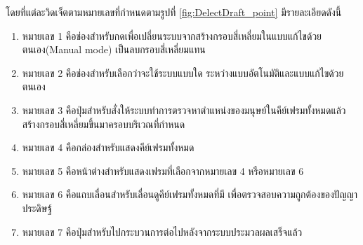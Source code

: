 โดยที่แต่ละวิดเจ็ตตามหมายเลขที่กำหนดตามรูปที่ \ref{fig:DelectDraft_point} มีรายละเอียดดังนี้
\begin{enumerate}
	\setlength\itemsep{-0.25em}
    \item หมายเลข 1 คือช่องสำหรับกดเพื่อเปลี่ยนระบบจากสร้างกรอบสี่เหลี่ยมในแบบแก้ไขด้วยตนเอง(Manual mode) เป็นลบกรอบสี่เหลี่ยมแทน
    \item หมายเลข 2 คือช่องสำหรับเลือกว่าจะใช้ระบบแบบใด ระหว่างแบบอัตโนมัติและแบบแก้ไขด้วยตนเอง
    \item หมายเลข 3 คือปุ่มสำหรับสั่งให้ระบบทำการตรวจหาตำแหน่งของมนุษย์ในคีย์เฟรมทั้งหมดแล้วสร้างกรอบสี่เหลี่ยมขึ้นมาครอบบริเวณที่กำหนด
	\item หมายเลข 4 คือกล่องสำหรับแสดงคีย์เฟรมทั้งหมด
	\item หมายเลข 5 คือหน้าต่างสำหรับแสดงเฟรมที่เลือกจากหมายเลข 4 หรือหมายเลข 6
	\item หมายเลข 6 คือแถบเลื่อนสำหรับเลื่อนดูคีย์เฟรมทั้งหมดที่มี เพื่อตรวจสอบความถูกต้องของปัญญาประดิษฐ์
	\item หมายเลข 7 คือปุ่มสำหรับไปกระบวนการต่อไปหลังจากระบบประมวลผลเสร็จแล้ว
\end{enumerate}
\clearpage

